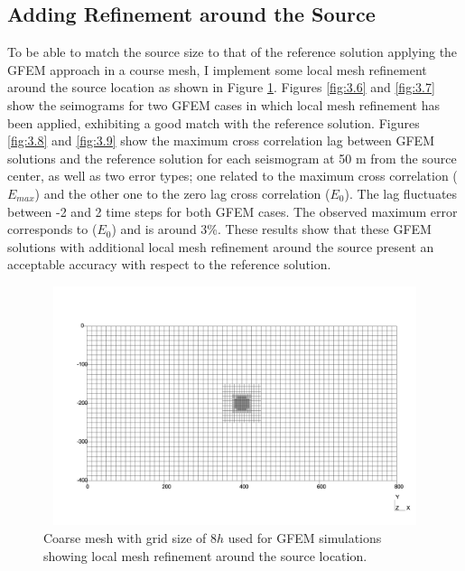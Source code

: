 \clearpage
\subsection{Adding Refinement around the Source}
To be able to match the source size to that of the reference solution applying the GFEM  approach in a course mesh, I implement some local mesh refinement around the source location as shown in Figure \ref{fig:3.5}. Figures \ref{fig:3.6} and \ref{fig:3.7} show the seimograms for two GFEM cases in which local mesh refinement has been applied, exhibiting a good match with the reference solution. Figures \ref{fig:3.8} and \ref{fig:3.9} show the maximum cross correlation lag between GFEM solutions and the reference solution for each seismogram at 50 m from the source center, as well as two error types; one related to the maximum cross correlation ($E_{max}$) and the other one to the zero lag cross correlation ($E_0$). The lag fluctuates between -2 and 2 time steps for both GFEM cases. The observed maximum error corresponds to ($E_0$) and is around 3\%. These results show that these GFEM solutions with additional local mesh refinement around the source present an acceptable accuracy with respect to the reference solution.

 \begin{figure}[h!]
	\centering
	\includegraphics[width=14cm, height=7cm]{Thesis_Edith/figures/homo/h_source_doubleRef2.pdf}
	\caption{Coarse mesh with grid size of $8h$ used for GFEM simulations showing local mesh refinement around the source location.}
	\label{fig:3.5}
\end{figure}

